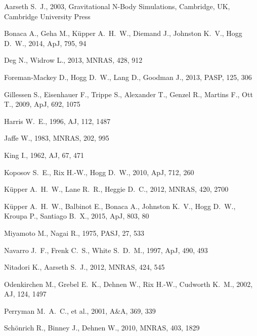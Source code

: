 Aarseth S.~J., 2003, Gravitational N-Body Simulations, Cambridge, UK, Cambridge University Press 

Bonaca A., Geha M., K{\"u}pper A.~H.~W., Diemand J., Johnston K.~V., Hogg D.~W., 2014, ApJ, 795, 94 

Deg N., Widrow L., 2013, MNRAS, 428, 912 

Foreman-Mackey D., Hogg D.~W., Lang D., Goodman J., 2013, PASP, 125, 306 

Gillessen S., Eisenhauer F., Trippe S., Alexander T., Genzel R., Martins F., Ott T., 2009, ApJ, 692, 1075 

Harris W.~E., 1996, AJ, 112, 1487 

Jaffe W., 1983, MNRAS, 202, 995 

King I., 1962, AJ, 67, 471 

Koposov S.~E., Rix H.-W., Hogg D.~W., 2010, ApJ, 712, 260 

K{\"u}pper A.~H.~W., Lane R.~R., Heggie D.~C., 2012, MNRAS, 420, 2700 

K{\"u}pper A.~H.~W., Balbinot E., Bonaca A., Johnston K.~V., Hogg D.~W., Kroupa P., Santiago B.~X., 2015, ApJ, 803, 80 

Miyamoto M., Nagai R., 1975, PASJ, 27, 533 

Navarro J.~F., Frenk C.~S., White S.~D.~M., 1997, ApJ, 490, 493 

Nitadori K., Aarseth S.~J., 2012, MNRAS, 424, 545 

Odenkirchen M., Grebel E.~K., Dehnen W., Rix H.-W., Cudworth K.~M., 2002, AJ, 124, 1497 

Perryman M.~A.~C., et al., 2001, A\&A, 369, 339 

Sch{\"o}nrich R., Binney J., Dehnen W., 2010, MNRAS, 403, 1829 

